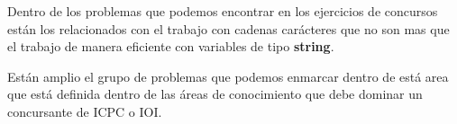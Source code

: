 Dentro de los problemas que podemos encontrar en los ejercicios de concursos están los relacionados con el trabajo con cadenas carácteres que no son mas que el trabajo de manera eficiente con variables de tipo \textbf{string}. 

Están amplio el grupo de problemas que podemos enmarcar dentro de está area que está definida dentro de las áreas de conocimiento que debe dominar un concursante de ICPC o IOI.